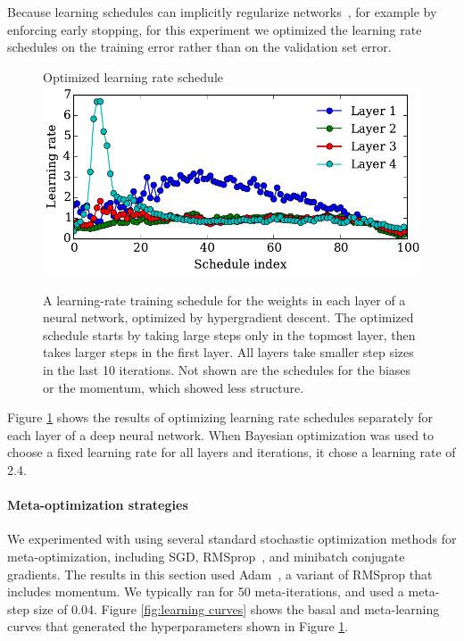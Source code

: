 \documentclass{article}
\newcommand{\primal}{basal}
\begin{document}
Because learning schedules can implicitly regularize networks~\cite{erhan2010does}, for example by enforcing early stopping, for this experiment we optimized the learning rate schedules on the training error rather than on the validation set error.
%
\begin{figure}[h!]
\vskip 0.1in
\begin{center}
Optimized learning rate schedule \\
\includegraphics[width=\columnwidth]{../experiments/Feb_3_training_schedules/3_adam_50/schedules_small.pdf}
\vskip -0.1in
\caption{A learning-rate training schedule for the weights in each layer of a neural network, optimized by hypergradient descent.
The optimized schedule starts by taking large steps only in the topmost layer, then takes larger steps in the first layer.
All layers take smaller step sizes in the last 10 iterations.
Not shown are the schedules for the biases or the momentum, which showed less structure.}
\label{fig:optimal schedule}
\end{center}
\vskip -0.1in
\end{figure} 
%
Figure \ref{fig:optimal schedule} shows the results of optimizing learning rate schedules separately for each layer of a deep neural network.
When Bayesian optimization was used to choose a fixed learning rate for all layers and iterations, it chose a learning rate of 2.4.

\paragraph{Meta-optimization strategies}
We experimented with using several standard stochastic optimization methods for meta-optimization, including SGD, RMSprop~\citep{Tieleman2012}, and minibatch conjugate gradients.
The results in this section used Adam~\citep{Adam14}, a variant of RMSprop that includes momentum.
We typically ran for 50 meta-iterations, and used a meta-step size of 0.04.
Figure \ref{fig:learning curves} shows the \primal{} and meta-learning curves that generated the hyperparameters shown in Figure \ref{fig:optimal schedule}.
\end{document}
